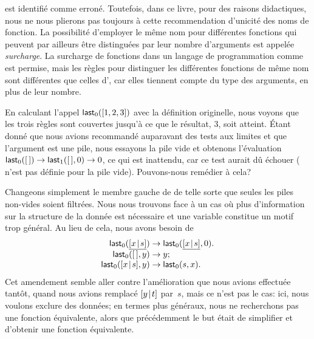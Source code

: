 est identifié comme erroné. Toutefois, dans ce livre, pour des raisons
didactiques, nous ne nous plierons pas toujours à cette recommendation
d'unicité des noms de fonction. La possibilité d'employer le même nom
pour différentes fonctions qui peuvent par ailleurs être distinguées
par leur nombre d'arguments est appelée \emph{surcharge}. La surcharge
de fonctions dans un langage de programmation comme \Cpp est permise,
mais les règles pour distinguer les différentes fonctions de même nom
sont différentes que celles d'\Erlang, car elles tiennent compte du
type des arguments, en plus de leur nombre.

En calculant l'appel \(\textsf{last}_0([1,2,3])\) avec la définition
originelle, nous voyons que les trois règles sont couvertes jusqu'à ce
que le résultat, \(3\), soit atteint. Étant donné que nous avions
recommandé auparavant des tests aux limites et que l'argument est une
pile, nous essayons la pile vide et obtenons l'évaluation
\(\textsf{last}_0([\,]) \rightarrow \textsf{last}_1([\,],0) \rightarrow 0\),
ce qui est inattendu, car ce test aurait dû échouer (
n'est pas définie pour la pile vide). Pouvons-nous remédier à cela?

Changeons simplement le membre gauche de  de telle
sorte que seules les piles non-vides soient filtrées. Nous nous
trouvons face à un cas où plus d'information sur la structure de la
donnée est nécessaire et une variable constitue un motif trop
général. Au lieu de cela, nous avons besoin de
\begin{equation*}
\begin{array}{r@{\;}c@{\;}l}
\fun{last}_0(\underline{\cons{x}{s}}) & \rightarrow &
  \fun{last}_0(\underline{\cons{x}{s}},0).\\
\fun{last}_0(\el,y) & \rightarrow & y;\\
\fun{last}_0(\cons{x}{s},y) & \rightarrow & \fun{last}_0(s,x).
\end{array}
\end{equation*}
Cet amendement semble aller contre l'amélioration que nous avions
effectuée tantôt, quand nous avions remplacé \([{y}\!\mid\!{t}]\)
par~\(s\), mais ce n'est pas le cas: ici, nous voulons exclure des
données; en termes plus généraux, nous ne recherchons pas une fonction
équivalente, alors que précédemment le but était de simplifier et
d'obtenir une fonction équivalente.

